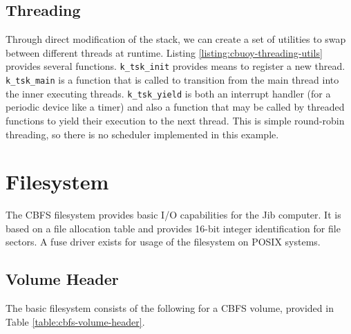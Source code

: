 \documentclass{article}
\begin{document}
\subsection{Threading}

Through direct modification of the stack, we can create a set of utilities to swap between different threads at runtime. Listing \ref{listing:cbuoy-threading-utils} provides several functions. \texttt{k\_tsk\_init} provides means to register a new thread. \texttt{k\_tsk\_main} is a function that is called to transition from the main thread into the inner executing threads. \texttt{k\_tsk\_yield} is both an interrupt handler (for a periodic device like a timer) and also a function that may be called by threaded functions to yield their execution to the next thread. This is simple round-robin threading, so there is no scheduler implemented in this example.



\pagebreak

\section{Filesystem}

The CBFS filesystem provides basic I/O capabilities for the Jib computer. It is based on a file allocation table and provides 16-bit integer identification for file sectors. A fuse driver exists for usage of the filesystem on POSIX systems.

\subsection{Volume Header}

The basic filesystem consists of the following for a CBFS volume, provided in Table \ref{table:cbfs-volume-header}.
\end{document}

